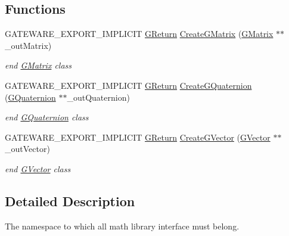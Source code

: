 \subsection*{Functions}
\begin{DoxyCompactItemize}
\item 
G\+A\+T\+E\+W\+A\+R\+E\+\_\+\+E\+X\+P\+O\+R\+T\+\_\+\+I\+M\+P\+L\+I\+C\+IT \mbox{\hyperlink{namespace_g_w_a67a839e3df7ea8a5c5686613a7a3de21}{G\+Return}} \mbox{\hyperlink{namespace_g_w_1_1_m_a_t_h_a32e9bb10a0b5fc1b730822ee510d6ce1}{Create\+G\+Matrix}} (\mbox{\hyperlink{class_g_w_1_1_m_a_t_h_1_1_g_matrix}{G\+Matrix}} $\ast$$\ast$\+\_\+out\+Matrix)
\begin{DoxyCompactList}\small\item\em end \mbox{\hyperlink{class_g_w_1_1_m_a_t_h_1_1_g_matrix}{G\+Matrix}} class \end{DoxyCompactList}\item 
G\+A\+T\+E\+W\+A\+R\+E\+\_\+\+E\+X\+P\+O\+R\+T\+\_\+\+I\+M\+P\+L\+I\+C\+IT \mbox{\hyperlink{namespace_g_w_a67a839e3df7ea8a5c5686613a7a3de21}{G\+Return}} \mbox{\hyperlink{namespace_g_w_1_1_m_a_t_h_a1cb97726e251c442ce358c884f3498a0}{Create\+G\+Quaternion}} (\mbox{\hyperlink{class_g_w_1_1_m_a_t_h_1_1_g_quaternion}{G\+Quaternion}} $\ast$$\ast$\+\_\+out\+Quaternion)
\begin{DoxyCompactList}\small\item\em end \mbox{\hyperlink{class_g_w_1_1_m_a_t_h_1_1_g_quaternion}{G\+Quaternion}} class \end{DoxyCompactList}\item 
G\+A\+T\+E\+W\+A\+R\+E\+\_\+\+E\+X\+P\+O\+R\+T\+\_\+\+I\+M\+P\+L\+I\+C\+IT \mbox{\hyperlink{namespace_g_w_a67a839e3df7ea8a5c5686613a7a3de21}{G\+Return}} \mbox{\hyperlink{namespace_g_w_1_1_m_a_t_h_a32dfb827d42ce2d17ed6b4b0e70e4215}{Create\+G\+Vector}} (\mbox{\hyperlink{class_g_w_1_1_m_a_t_h_1_1_g_vector}{G\+Vector}} $\ast$$\ast$\+\_\+out\+Vector)
\begin{DoxyCompactList}\small\item\em end \mbox{\hyperlink{class_g_w_1_1_m_a_t_h_1_1_g_vector}{G\+Vector}} class \end{DoxyCompactList}\end{DoxyCompactItemize}


\subsection{Detailed Description}
The namespace to which all math library interface must belong. 

